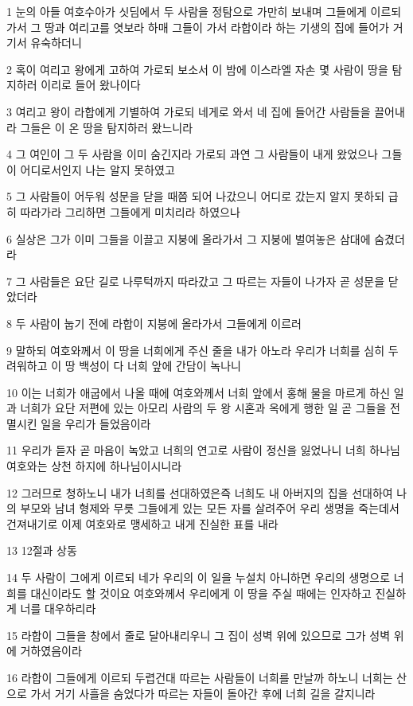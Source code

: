 \par 1 눈의 아들 여호수아가 싯딤에서 두 사람을 정탐으로 가만히 보내며 그들에게 이르되 가서 그 땅과 여리고를 엿보라 하매 그들이 가서 라합이라 하는 기생의 집에 들어가 거기서 유숙하더니
\par 2 혹이 여리고 왕에게 고하여 가로되 보소서 이 밤에 이스라엘 자손 몇 사람이 땅을 탐지하러 이리로 들어 왔나이다
\par 3 여리고 왕이 라합에게 기별하여 가로되 네게로 와서 네 집에 들어간 사람들을 끌어내라 그들은 이 온 땅을 탐지하러 왔느니라
\par 4 그 여인이 그 두 사람을 이미 숨긴지라 가로되 과연 그 사람들이 내게 왔었으나 그들이 어디로서인지 나는 알지 못하였고
\par 5 그 사람들이 어두워 성문을 닫을 때쯤 되어 나갔으니 어디로 갔는지 알지 못하되 급히 따라가라 그리하면 그들에게 미치리라 하였으나
\par 6 실상은 그가 이미 그들을 이끌고 지붕에 올라가서 그 지붕에 벌여놓은 삼대에 숨겼더라
\par 7 그 사람들은 요단 길로 나루턱까지 따라갔고 그 따르는 자들이 나가자 곧 성문을 닫았더라
\par 8 두 사람이 눕기 전에 라합이 지붕에 올라가서 그들에게 이르러
\par 9 말하되 여호와께서 이 땅을 너희에게 주신 줄을 내가 아노라 우리가 너희를 심히 두려워하고 이 땅 백성이 다 너희 앞에 간담이 녹나니
\par 10 이는 너희가 애굽에서 나올 때에 여호와께서 너희 앞에서 홍해 물을 마르게 하신 일과 너희가 요단 저편에 있는 아모리 사람의 두 왕 시혼과 옥에게 행한 일 곧 그들을 전멸시킨 일을 우리가 들었음이라
\par 11 우리가 듣자 곧 마음이 녹았고 너희의 연고로 사람이 정신을 잃었나니 너희 하나님 여호와는 상천 하지에 하나님이시니라
\par 12 그러므로 청하노니 내가 너희를 선대하였은즉 너희도 내 아버지의 집을 선대하여 나의 부모와 남녀 형제와 무릇 그들에게 있는 모든 자를 살려주어 우리 생명을 죽는데서 건져내기로 이제 여호와로 맹세하고 내게 진실한 표를 내라
\par 13 12절과 상동
\par 14 두 사람이 그에게 이르되 네가 우리의 이 일을 누설치 아니하면 우리의 생명으로 너희를 대신이라도 할 것이요 여호와께서 우리에게 이 땅을 주실 때에는 인자하고 진실하게 너를 대우하리라
\par 15 라합이 그들을 창에서 줄로 달아내리우니 그 집이 성벽 위에 있으므로 그가 성벽 위에 거하였음이라
\par 16 라합이 그들에게 이르되 두렵건대 따르는 사람들이 너희를 만날까 하노니 너희는 산으로 가서 거기 사흘을 숨었다가 따르는 자들이 돌아간 후에 너희 길을 갈지니라
